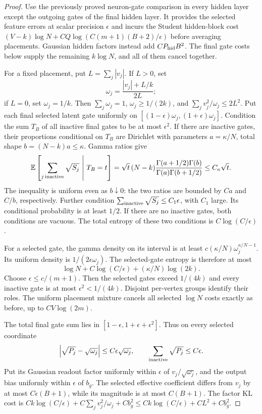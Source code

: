 \begin{proof}
Use the previously proved neuron-gate comparison in every hidden layer except the outgoing gates of the final hidden layer. It provides the selected feature errors at scalar precision $\epsilon$ and incurs the Student hidden-block cost $(V-k)\log N+CQ\log(C(m+1)(B+2)/\epsilon)$ before averaging placements. Gaussian hidden factors instead add $CP_{\rm hid}B^2$. The final gate costs below supply the remaining $k\log N$, and all of them cancel together.

For a fixed placement, put $L=\sum_j|v_j|$. If $L>0$, set
\[
 \omega_j=\frac{|v_j|+L/k}{2L};
\]
if $L=0$, set $\omega_j=1/k$. Then $\sum_j\omega_j=1$, $\omega_j\ge1/(2k)$, and $\sum_jv_j^2/\omega_j\le2L^2$. Put each final selected latent gate uniformly on $[(1-\epsilon)\omega_j,(1+\epsilon)\omega_j]$. Condition the sum $T_B$ of all inactive final gates to be at most $\epsilon^2$. If there are inactive gates, their proportions conditional on $T_B$ are Dirichlet with parameters $a=\kappa/N$, total shape $b=(N-k)a\le\kappa$. Gamma ratios give
\[
 \E\left[\sum_{j\,\mathrm{inactive}}\sqrt{S_j}\ \middle|\ T_B=t\right]
 =\sqrt t\,(N-k)
    \frac{\Gamma(a+1/2)\Gamma(b)}{\Gamma(a)\Gamma(b+1/2)}
 \le C_\kappa\sqrt t.
\]
The inequality is uniform even as $b\downarrow0$: the two ratios are bounded by $Ca$ and $C/b$, respectively. Further condition
$\sum_{\rm inactive}\sqrt{S_j}\le C_1\epsilon$, with $C_1$ large. Its conditional probability is at least $1/2$. If there are no inactive gates, both conditions are vacuous. The total entropy of these two conditions is $C\log(C/\epsilon)$.

For a selected gate, the gamma density on its interval is at least
$c(\kappa/N)\omega_j^{\kappa/N-1}$. Its uniform density is $1/(2\epsilon\omega_j)$.
The selected-gate entropy is therefore at most
\[
 \log N+C\log(C/\epsilon)+(\kappa/N)\log(2k).
\]
Choose $\epsilon\le c/(m+1)$. Then the selected gates exceed $1/(4k)$ and every inactive gate is at most $\epsilon^2<1/(4k)$. Disjoint per-vertex groups identify their roles. The uniform placement mixture cancels all selected $\log N$ costs exactly as before, up to $CV\log(2m)$.

The total final gate sum lies in
$[1-\epsilon,1+\epsilon+\epsilon^2]$. Thus on every selected coordinate
\[
 \left|\sqrt{P_j}-\sqrt{\omega_j}\right|
 \le C\epsilon\sqrt{\omega_j},
 \qquad
 \sum_{\rm inactive}\sqrt{P_j}\le C\epsilon.
\]
Put its Gaussian readout factor uniformly within $\epsilon$ of
$v_j/\sqrt{\omega_j}$, and the output bias uniformly within $\epsilon$ of $b_g$.
The selected effective coefficient differs from $v_j$ by at most
$C\epsilon(B+1)$, while its magnitude is at most $C(B+1)$.
The factor KL cost is
$Ck\log(C/\epsilon)+C\sum_jv_j^2/\omega_j+Cb_g^2\le Ck\log(C/\epsilon)+CL^2+Cb_g^2$.


\end{proof}

